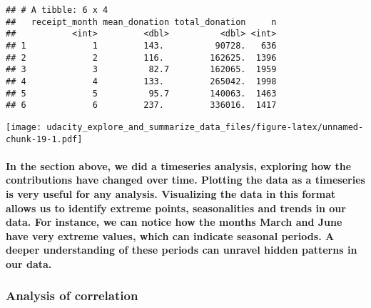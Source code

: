 \documentclass[]{article}
\let\oldparagraph\paragraph
\renewcommand{\paragraph}[1]{\oldparagraph{#1}\mbox{}}
\begin{document}
\begin{verbatim}
## # A tibble: 6 x 4
##   receipt_month mean_donation total_donation     n
##           <int>         <dbl>          <dbl> <int>
## 1             1         143.          90728.   636
## 2             2         116.         162625.  1396
## 3             3          82.7        162065.  1959
## 4             4         133.         265042.  1998
## 5             5          95.7        140063.  1463
## 6             6         237.         336016.  1417
\end{verbatim}

\texttt{[image: udacity\_explore\_and\_summarize\_data\_files/figure-latex/unnamed-chunk-19-1.pdf]}

\paragraph{In the section above, we did a timeseries analysis, exploring
how the contributions have changed over time. Plotting the data as a
timeseries is very useful for any analysis. Visualizing the data in this
format allows us to identify extreme points, seasonalities and trends in
our data. For instance, we can notice how the months March and June have
very extreme values, which can indicate seasonal periods. A deeper
understanding of these periods can unravel hidden patterns in our
data.}\label{in-the-section-above-we-did-a-timeseries-analysis-exploring-how-the-contributions-have-changed-over-time.-plotting-the-data-as-a-timeseries-is-very-useful-for-any-analysis.-visualizing-the-data-in-this-format-allows-us-to-identify-extreme-points-seasonalities-and-trends-in-our-data.-for-instance-we-can-notice-how-the-months-march-and-june-have-very-extreme-values-which-can-indicate-seasonal-periods.-a-deeper-understanding-of-these-periods-can-unravel-hidden-patterns-in-our-data.}

\subsubsection{Analysis of correlation}\label{analysis-of-correlation}
\end{document}
